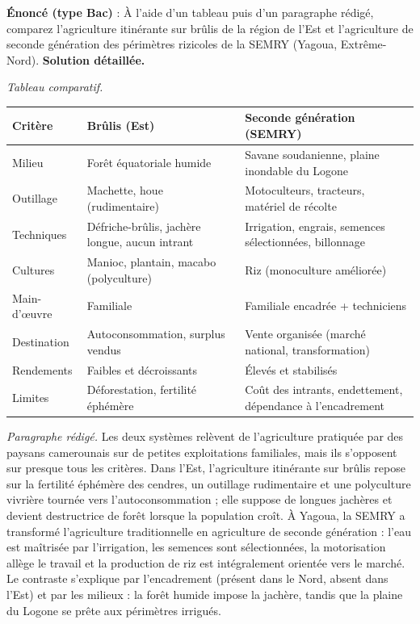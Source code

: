 \documentclass[11pt]{article}
\begin{document}
\begin{exoresolu}
\textbf{Énoncé (type Bac)} : À l'aide d'un tableau puis d'un paragraphe rédigé, comparez l'agriculture itinérante sur brûlis de la région de l'Est et l'agriculture de seconde génération des périmètres rizicoles de la SEMRY (Yagoua, Extrême-Nord).
\tcblower
\textbf{Solution détaillée.}

\emph{Tableau comparatif.}

\begin{center}
\begin{tabularx}{\linewidth}{|l|X|X|}\hline
\rowcolor{popblueL} \textbf{Critère} & \textbf{Brûlis (Est)} & \textbf{Seconde génération (SEMRY)} \\ \hline
Milieu & Forêt équatoriale humide & Savane soudanienne, plaine inondable du Logone \\ \hline
Outillage & Machette, houe (rudimentaire) & Motoculteurs, tracteurs, matériel de récolte \\ \hline
Techniques & Défriche-brûlis, jachère longue, aucun intrant & Irrigation, engrais, semences sélectionnées, billonnage \\ \hline
Cultures & Manioc, plantain, macabo (polyculture) & Riz (monoculture améliorée) \\ \hline
Main-d'œuvre & Familiale & Familiale encadrée + techniciens \\ \hline
Destination & Autoconsommation, surplus vendus & Vente organisée (marché national, transformation) \\ \hline
Rendements & Faibles et décroissants & Élevés et stabilisés \\ \hline
Limites & Déforestation, fertilité éphémère & Coût des intrants, endettement, dépendance à l'encadrement \\ \hline
\end{tabularx}
\end{center}

\emph{Paragraphe rédigé.} Les deux systèmes relèvent de l'agriculture pratiquée par des paysans camerounais sur de petites exploitations familiales, mais ils s'opposent sur presque tous les critères. Dans l'Est, l'agriculture itinérante sur brûlis repose sur la fertilité éphémère des cendres, un outillage rudimentaire et une polyculture vivrière tournée vers l'autoconsommation ; elle suppose de longues jachères et devient destructrice de forêt lorsque la population croît. À Yagoua, la SEMRY a transformé l'agriculture traditionnelle en agriculture de seconde génération : l'eau est maîtrisée par l'irrigation, les semences sont sélectionnées, la motorisation allège le travail et la production de riz est intégralement orientée vers le marché. Le contraste s'explique par l'encadrement (présent dans le Nord, absent dans l'Est) et par les milieux : la forêt humide impose la jachère, tandis que la plaine du Logone se prête aux périmètres irrigués.


\end{exoresolu}
\end{document}
